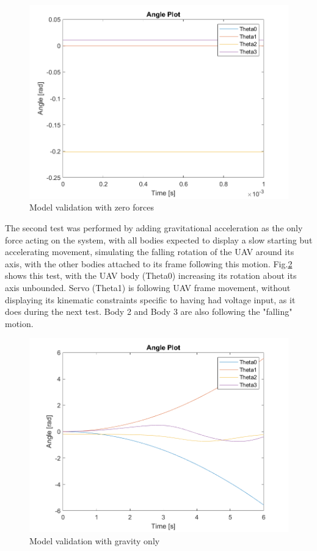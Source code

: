 \begin{figure}[H]
  \centering
  \includegraphics[scale=0.8]{graphics/Integration/staticThetas.png}
  \caption{Model validation with zero forces}
  \label{fig:Model validation with zero forces}
\end{figure}

The second test was performed by adding gravitational acceleration as the only force acting on the system, with all bodies expected to display a slow starting but accelerating movement, simulating the falling rotation of the UAV around its axis, with the other bodies attached to its frame following this motion. Fig.\ref{fig:Model validation with gravity only} shows this test, with the UAV body (Theta0) increasing its rotation about its axis unbounded. Servo (Theta1) is following UAV frame movement, without displaying its kinematic constraints specific to having had voltage input, as it does during the next test. Body 2 and Body 3 are also following the "falling" motion. 

\begin{figure}[H]
  \centering
  \includegraphics[scale=0.8]{graphics/Integration/g_thetas.png}
  \caption{Model validation with gravity only}
  \label{fig:Model validation with gravity only}
\end{figure}

